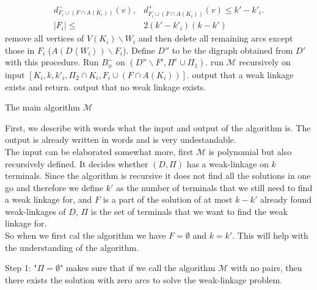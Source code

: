 \begin{algorithm}
\begin{algorithmic}[1]
{                \begin{align}
                    d^-_{F_i\cup(F\cap A(K_i))}(v),&d^+_{F_i\cup(F\cap A(K_i))}(v)\leq k'-k'_i.\\
                    |F_i|\leq &2(k'-k'_i)(k-k')
                \end{align}
                }
                        \STATE remove all vertices of $V(K_i)\backslash W_i$ and then delete all remaining arcs except those in $F_i$ ($A(D\left< W_i\right>)\backslash F_i$).
                    \ENDFOR
                    \STATE Define $D''$ to be the digraph obtained from $D'$ with this procedure.
                    \STATE Run $B_{\phi}^-$ on $(D''\backslash F',\Pi^e\cup\Pi_1)$.
                        \STATE run $\mathcal{M}$ recursively on input $[K_i,k,k'_i,\Pi_2\cap K_i,F_i\cup(F\cap A(K_i))]$.
                    \ENDFOR 
                \ENDFOR
            \ENDIF
                \STATE output that a weak linkage exists and return.
            \ENDIF
        \ENDFOR 
        \STATE output that no weak linkage exists.
    \end{algorithmic}
    \caption{The main algorithm $\mathcal{M}$}
    \label{alg:weakphi}
\end{algorithm}

    First, we describe with words what the input and output of the algorithm is. 
    The output is already written in words and is very undestandable. \\
    The input can be elaborated somewhat more, first $\mathcal{M}$ is polynomial but also recursively defined. 
    It decides whether $(D,\Pi)$  has a weak-linkage on $k$ terminals. 
    Since the algorithm is recursive it does not find all the solutions in one go and therefore we define $k'$ as the number of terminals that we still need to find a weak linkage for, and $F$ is a part of the solution of at most $k-k'$ already found weak-linkages of $D$, $\Pi$ is the set of terminals that we want to find the weak linkage for. \\
    So when we first cal the algorithm we have $F=\emptyset$ and $k=k'$. 
    This will help with the understanding of the algorithm.    
     
    Step 1: "$\Pi=\emptyset$" makes sure that if we call the algorithm $\mathcal{M}$ with no pairs, then there exists the solution with zero arcs to solve the weak-linkage problem. \\

